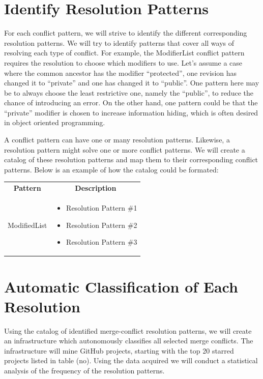 \section{Identify Resolution Patterns}
For each conflict pattern, we will strive to identify the different corresponding resolution patterns. We will try to identify patterns that cover all ways of resolving each type of conflict. For example, the ModifierList conflict pattern requires the resolution to choose which modifiers to use. Let's assume a case where the common ancestor has the modifier “protected”, one revision has changed it to “private” and one has changed it to “public”. One pattern here may be to always choose the least restrictive one, namely the “public”, to reduce the chance of introducing an error. On the other hand, one pattern could be that the “private” modifier is chosen to increase information hiding, which is often desired in object oriented programming.

A conflict pattern can have one or many resolution patterns. Likewise, a resolution pattern might solve one or more conflict patterns. We will create a catalog of these resolution patterns and map them to their corresponding conflict patterns. Below is an example of how the catalog could be formated:\\
\begin{tabular}{ p{8cm} p{6cm} }
\hline
\multicolumn{1}{c}{\textbf{Pattern}} & \multicolumn{1}{c}{\textbf{Description}}\\
ModifiedList &
\begin{itemize}
\item Resolution Pattern \#1
\item Resolution Pattern \#2
\item Resolution Pattern \#3
\end{itemize}
\end{tabular}
\section{Automatic Classification of Each Resolution}
Using the catalog of identified merge-conflict resolution patterns, we will create an infrastructure which autonomously classifies all selected merge conflicts. The infrastructure will mine GitHub projects, starting with the top 20 starred projects listed in table (no). Using the data acquired we will conduct a statistical analysis of the frequency of the resolution patterns.
